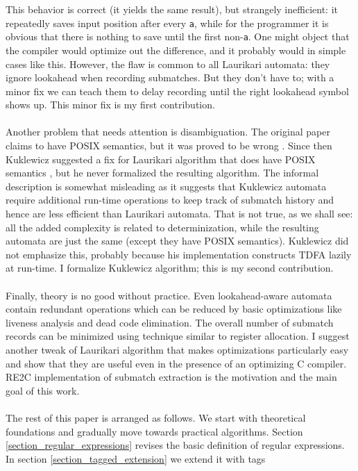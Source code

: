 \documentclass{article}
\theoremstyle{definition}
\begin{document}
\begin{multicols}{2}
This behavior is correct (it yields the same result), but strangely inefficient:
it repeatedly saves input position after every \texttt{a},
while for the programmer it is obvious that there is nothing to save until the first non-\texttt{a}.
One might object that the compiler would optimize out the difference,
and it probably would in simple cases like this.
However, the flaw is common to all Laurikari automata:
they ignore lookahead when recording submatches.
But they don't have to; with a minor fix we can teach them
to delay recording until the right lookahead symbol shows up.
This minor fix is my first contribution.
\\ \\
Another problem that needs attention is disambiguation.
The original paper \cite{Lau01} claims to have POSIX semantics, but it was proved to be wrong \cite{LTU}.
Since then Kuklewicz suggested a fix for Laurikari algorithm that does have POSIX semantics \cite{Regex-TDFA}, but he never formalized the resulting algorithm.
The informal description \cite{Kuk07} is somewhat misleading as it suggests that Kuklewicz automata
require additional run-time operations to keep track of submatch history and hence are less efficient than Laurikari automata.
That is not true, as we shall see: all the added complexity is related to determinization,
while the resulting automata are just the same (except they have POSIX semantics).
Kuklewicz did not emphasize this, probably because his implementation constructs TDFA lazily at run-time.
I formalize Kuklewicz algorithm; this is my second contribution.
\\ \\
Finally, theory is no good without practice.
Even lookahead-aware automata contain redundant operations
which can be reduced by basic optimizations like liveness analysis and dead code elimination.
The overall number of submatch records can be minimized using technique similar to register allocation.
I suggest another tweak of Laurikari algorithm that makes optimizations particularly easy
and show that they are useful even in the presence of an optimizing C compiler.
RE2C implementation of submatch extraction is the motivation and the main goal of this work.
\\ \\
The rest of this paper is arranged as follows.
We start with theoretical foundations and gradually move towards practical algorithms.
Section \ref{section_regular_expressions} revises the basic definition of regular expressions.
In section \ref{section_tagged_extension} we extend it with tags

\end{multicols}
\end{document}
